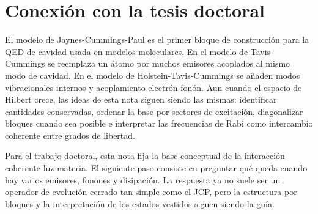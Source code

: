 \documentclass[11pt]{article}
\begin{document}
\section{Conexi\'on con la tesis doctoral}

El modelo de Jaynes-Cummings-Paul es el primer bloque de construcci\'on para
la QED de cavidad usada en modelos moleculares. En el modelo de
Tavis-Cummings se reemplaza un \'atomo por muchos emisores acoplados al mismo
modo de cavidad. En el modelo de Holstein-Tavis-Cummings se a\~naden modos
vibracionales internos y acoplamiento electr\'on-fon\'on. Aun cuando el espacio
de Hilbert crece, las ideas de esta nota siguen siendo las mismas: identificar
cantidades conservadas, ordenar la base por sectores de excitaci\'on,
diagonalizar bloques cuando sea posible e interpretar las frecuencias de Rabi
como intercambio coherente entre grados de libertad.

Para el trabajo doctoral, esta nota fija la base conceptual de la interacci\'on
coherente luz-materia. El siguiente paso consiste en preguntar qu\'e queda
cuando hay varios emisores, fonones y disipaci\'on. La respuesta ya no suele ser
un operador de evoluci\'on cerrado tan simple como el JCP, pero la estructura
por bloques y la interpretaci\'on de los estados vestidos siguen siendo la gu\'ia.
\end{document}

